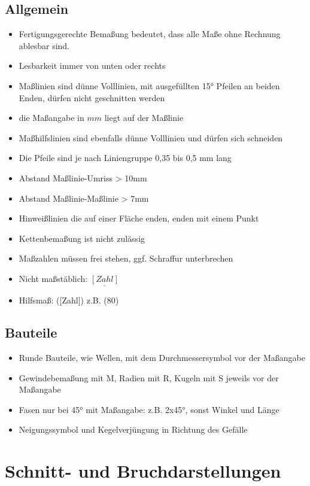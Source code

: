 \documentclass[a4paper,DIV=15,fontsize=11pt]{scrartcl}
\begin{document}
\subsection{Allgemein}
\begin{itemize}
	\item Fertigungsgerechte Bemaßung bedeutet, dass alle Maße ohne Rechnung ablesbar sind.
	\item Lesbarkeit immer von unten oder rechts
	\item Maßlinien sind dünne Volllinien, mit ausgefüllten 15° Pfeilen an beiden Enden, dürfen nicht geschnitten werden
	\item die Maßangabe in $mm$ liegt auf der Maßlinie
	\item Maßhilfslinien sind ebenfalls dünne Volllinien und dürfen sich schneiden
	\item Die Pfeile sind je nach Liniengruppe 0,35 bis 0,5 mm lang
	\item Abstand Maßlinie-Umriss > 10mm
	\item Abstand Maßlinie-Maßlinie > 7mm
	\item Hinweißlinien die auf einer Fläche enden, enden mit einem Punkt
	\item Kettenbemaßung ist nicht zulässig
	\item Maßzahlen müssen frei stehen, ggf. Schraffur unterbrechen
	\item Nicht maßstäblich: $\underline{[Zahl]}$
	\item Hilfsmaß: ([Zahl]) z.B. (80)
\end{itemize}
	
\subsection{Bauteile}
\begin{itemize}
	\item Runde Bauteile, wie Wellen, mit dem Durchmessersymbol vor der Maßangabe
	\item Gewindebemaßung mit M, Radien mit R, Kugeln mit S jeweils vor der Maßangabe
	\item Fasen nur bei 45° mit Maßangabe: z.B. 2x45°, sonst Winkel und Länge
	\item Neigungssymbol und Kegelverjüngung in Richtung des Gefälle
\end{itemize}	
	
\section{Schnitt- und Bruchdarstellungen}
\end{document}
